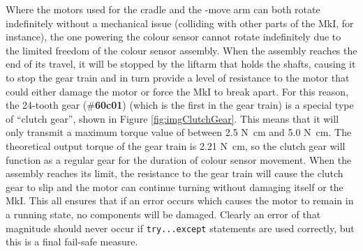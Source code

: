 \documentclass{report}
\newcommand{\tbo}[1]{\textbf{#1}}
\newcommand{\legopiece}[1]{(\#\tbo{#1})}
\newcommand{\move}[1]{\uppercase{\texttt{\formatmovesnospace{#1}}}-move}
\begin{document}
	Where the motors used for the cradle and the \move{x} arm can both rotate indefinitely without a mechanical issue (colliding with other parts of the MkI, for instance), the one powering the colour sensor cannot rotate indefinitely due to the limited freedom of the colour sensor assembly. When the assembly reaches the end of its travel, it will be stopped by the liftarm that holds the shafts, causing it to stop the gear train and in turn provide a level of resistance to the motor that could either damage the motor or force the MkI to break apart. For this reason, the 24-tooth gear \legopiece{60c01} (which is the first in the gear train) is a special type of \enquote{clutch gear}, shown in Figure \ref{fig:imgClutchGear}. This means that it will only transmit a maximum torque value of between 2.5 \si{\newton\centi\metre} and 5.0 \si{\newton\centi\metre}. The theoretical output torque of the gear train is 2.21 \si{\newton\centi\metre}, so the clutch gear will function as a regular gear for the duration of colour sensor movement. When the assembly reaches its limit, the resistance to the gear train will cause the clutch gear to slip and the motor can continue turning without damaging itself or the MkI. This all ensures that if an error occurs which causes the motor to remain in a running state, no components will be damaged. Clearly an error of that magnitude should never occur if \lstinline|try...except| statements are used correctly, but this is a final fail-safe measure.
	
\end{document}

